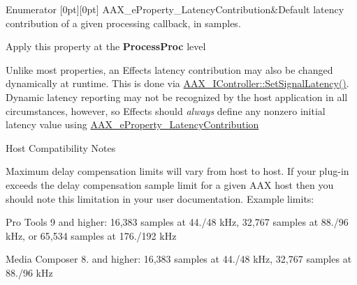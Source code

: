 \begin{DoxyEnumFields}{Enumerator}
[0pt][0pt]{}\mbox{\label{a00662_a13e384f22825afd3db6d68395b79ce0daa9037ffd2caf892bafe8f7f170548cb4}} 
A\+A\+X\+\_\+e\+Property\+\_\+\+Latency\+Contribution&Default latency contribution of a given processing callback, in samples. \begin{DoxyItemize}
\item Apply this property at the {\bfseries{Process\+Proc}} level\end{DoxyItemize}
Unlike most properties, an Effect\textquotesingle{}s latency contribution may also be changed dynamically at runtime. This is done via \mbox{\hyperlink{a01789_af2c648879419d94971c1308d8698601f}{A\+A\+X\+\_\+\+I\+Controller\+::\+Set\+Signal\+Latency()}}. Dynamic latency reporting may not be recognized by the host application in all circumstances, however, so Effects should {\itshape always} define any nonzero initial latency value using \mbox{\hyperlink{a00662_a13e384f22825afd3db6d68395b79ce0daa9037ffd2caf892bafe8f7f170548cb4}{A\+A\+X\+\_\+e\+Property\+\_\+\+Latency\+Contribution}}

\begin{DoxyRefDesc}{Host Compatibility Notes}
\item[\mbox{\hyperlink{a00786__compatibility_notes000065}{Host Compatibility Notes}}]Maximum delay compensation limits will vary from host to host. If your plug-\/in exceeds the delay compensation sample limit for a given A\+AX host then you should note this limitation in your user documentation. Example limits\+:
\begin{DoxyItemize}
\item Pro Tools 9 and higher\+: 16,383 samples at 44./48 k\+Hz, 32,767 samples at 88./96 k\+Hz, or 65,534 samples at 176./192 k\+Hz
\item Media Composer 8. and higher\+: 16,383 samples at 44./48 k\+Hz, 32,767 samples at 88./96 k\+Hz 
\end{DoxyItemize}\end{DoxyRefDesc}
\\
\hline


\end{DoxyEnumFields}

